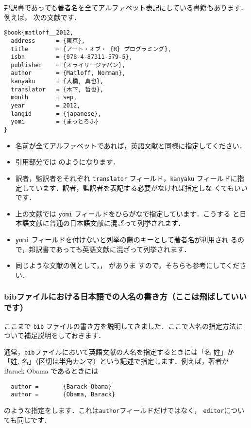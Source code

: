\documentclass[article]{jlreq}
\begin{document}
邦訳書であっても著者名を全てアルファベット表記にしている書籍もあります．例えば，
次の文献です．
\begin{screen}
\begin{verbatim}
@book{matloff__2012,
  address      = {東京},
  title        = {アート・オブ・ {R} プログラミング},
  isbn         = {978-4-87311-579-5},
  publisher    = {オライリージャパン},
  author       = {Matloff, Norman},
  kanyaku      = {大橋, 真也},
  translator   = {木下, 哲也},
  month        = sep,
  year         = 2012,
  langid       = {japanese},
  yomi         = {まっとろふ}
}
\end{verbatim}
\end{screen}
\begin{itemize}
 \item 名前が全てアルファベットであれば，英語文献と同様に指定してください．
 \item 引用部分では \citet{matloff__2012} のようになります．
 \item 訳者，監訳者をそれぞれ \texttt{translator} フィールド，\texttt{kanyaku}
       フィールドに指定しています．訳者，監訳者を表記する必要がなければ指定しな
       くてもいいです．
 \item 上の文献では \texttt{yomi} フィールドをひらがなで指定しています．こうする
       と日本語文献に普通の日本語文献に混ざって列挙されます．
 \item \texttt{yomi} フィールドを付けないと列挙の際のキーとして著者名が利用され
       るので，邦訳書であっても英語文献に混ざって列挙されます．
 \item 同じような文献の例として，\citet{Ryza2016}，\citet{Boswell-2012} がありま
       すので，そちらも参考にしてください．
\end{itemize}

\subsubsection{bibファイルにおける日本語での人名の書き方（ここは飛ばしていいです）}
\label{sec:nihonjin}

ここまで \texttt{bib} ファイルの書き方を説明してきました．ここで人名の指定方法に
ついて補足説明をしておきます．

通常，\texttt{bib}ファイルにおいて英語文献の人名を指定するときには「名 姓」か
「姓, 名」（区切は半角カンマ）という記述で指定します．例えば，著者が Barack
Obama であるときには
\begin{screen}
 \begin{verbatim}
  author =       {Barack Obama}
  author =       {Obama, Barack}
 \end{verbatim}
\end{screen}
のような指定をします．これは\texttt{author}フィールドだけではなく，
\texttt{editor}についても同じです．
\end{document}
